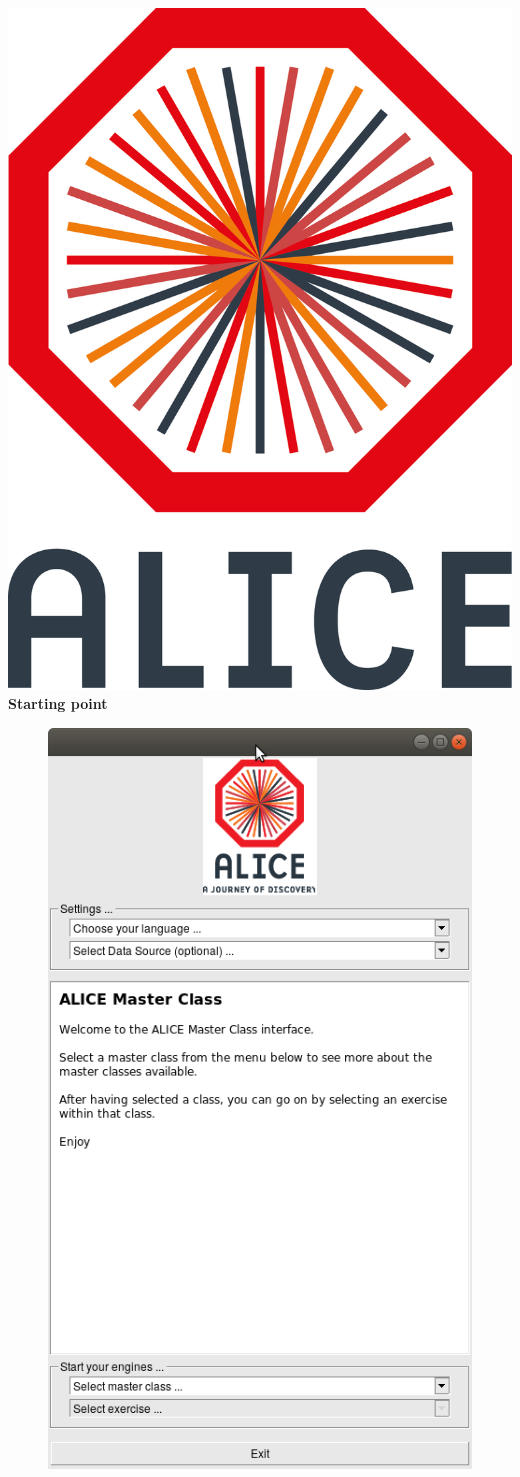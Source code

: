 \documentclass[aspectratio=169,14pt,dvipsnames]{beamer}
\begin{document}
\begin{frame}{\includegraphics[height=0.07\textheight]{2012-Jul-04-4_Color_Logo_CB.png} \hspace{0.2cm}\textbf{Starting point}}
\begin{figure}
    \includegraphics[height=0.8\textheight]{SelectionWindow.png}\hspace{0cm}
  \end{figure}
\end{frame}
\end{document}
